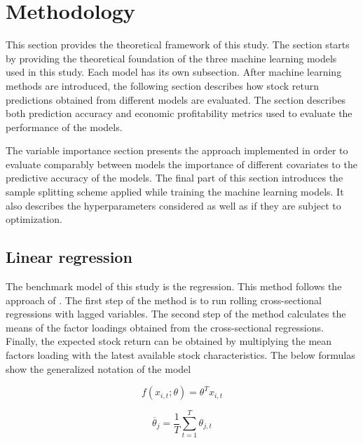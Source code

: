 \documentclass[12pt]{article}
\begin{document}


\section{Methodology} \label{Methodology}

This section provides the theoretical framework of this study. The section starts by providing the theoretical foundation of the three machine learning models used in this study. Each model has its own subsection. After machine learning methods are introduced, the following section describes how stock return predictions obtained from different models are evaluated. The section describes both prediction accuracy and economic profitability metrics used to evaluate the performance of the models. \par

The variable importance section presents the approach implemented in order to evaluate comparably between models the importance of different covariates to the predictive accuracy of the models. The final part of this section introduces the sample splitting scheme applied while training the machine learning models. It also describes the hyperparameters considered as well as if they are subject to optimization. \par

\subsection{Linear regression}\label{LinearRegression}
The benchmark model of this study is the \citet{FamaMacBeth1973} regression. This method follows the approach of \citet{Lewellen2015}. The first step of the method is to run rolling cross-sectional regressions with lagged variables. The second step of the method calculates the means of the factor loadings obtained from the cross-sectional regressions. Finally, the expected stock return can be obtained by multiplying the mean factors loading with the latest available stock characteristics. The below formulas show the generalized notation of the model \par

\begin{equation}
f(x_{i, t}; \theta) = \theta^T x_{i, t}
\end{equation}

\begin{equation}
\overline \theta_j = \frac{1}{T} \sum^{T}_{t=1}\theta_{j, t}
\end{equation}
\end{document}
